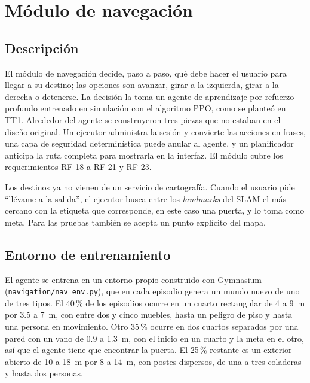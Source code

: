 \section{Módulo de navegación}
\label{sec:dev_nav}

\subsection{Descripción}

El módulo de navegación decide, paso a paso, qué debe hacer el usuario para llegar a su
destino; las opciones son avanzar, girar a la izquierda, girar a la derecha o detenerse.
La decisión la toma un agente de aprendizaje por refuerzo profundo entrenado en
simulación con el algoritmo PPO, como se planteó en TT1. Alrededor del agente se
construyeron tres piezas que no estaban en el diseño original. Un ejecutor administra la
sesión y convierte las acciones en frases, una capa de seguridad determinística puede
anular al agente, y un planificador anticipa la ruta completa para mostrarla en la
interfaz. El módulo cubre los requerimientos RF-18 a RF-21 y RF-23.

Los destinos ya no vienen de un servicio de cartografía. Cuando el usuario pide
``llévame a la salida'', el ejecutor busca entre los \emph{landmarks} del SLAM el más
cercano con la etiqueta que corresponde, en este caso una puerta, y lo toma como meta.
Para las pruebas también se acepta un punto explícito del mapa.

\subsection{Entorno de entrenamiento}

El agente se entrena en un entorno propio construido con Gymnasium
(\texttt{navigation/nav\_env.py}), que en cada episodio genera un mundo nuevo de uno de
tres tipos. El 40\,\% de los episodios ocurre en un cuarto rectangular de 4 a 9~m por
3.5 a 7~m, con entre dos y cinco muebles, hasta un peligro de piso y hasta una persona en
movimiento. Otro 35\,\% ocurre en dos cuartos separados por una pared con un vano de 0.9
a 1.3~m, con el inicio en un cuarto y la meta en el otro, así que el agente tiene que
encontrar la puerta. El 25\,\% restante es un exterior abierto de 10 a 18~m por 8 a
14~m, con postes dispersos, de una a tres coladeras y hasta dos personas.

